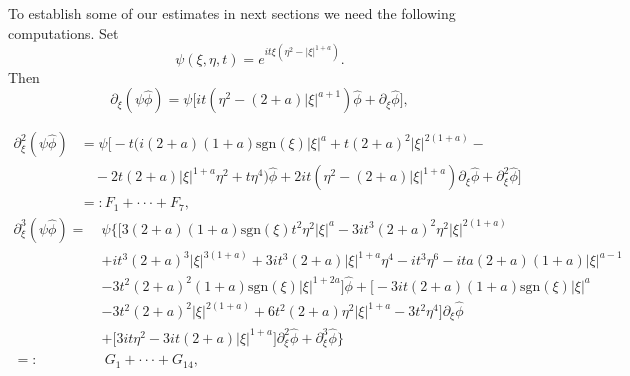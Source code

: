 \documentclass[reqno]{amsart}
\newcommand{\ha}{\hat{\phi}}
\newcommand{\p}{\partial}
\newcommand{\sgn}{\text{sgn}}
\numberwithin{equation}{section}
\begin{document}
To establish some of our estimates in next sections we need the following computations.
Set
\begin{equation}\label{psidef}
 \psi(\xi,\eta,t)=e^{it\xi(\eta^2-|\xi|^{1+a})}.
\end{equation}
Then
\begin{equation}\label{F1}
\partial_{\xi}(\psi\ha)=\psi\big[it(\eta^2 - (2+a)|\xi|^{a+1})\hat{\phi}+\p_\xi \ha \big],
\end{equation}

\begin{equation}
\begin{split}\label{F2}
\p_\xi^{2}(\psi\ha)&= \psi \big[-t(i(2+a)(1+a)\sgn(\xi)|\xi|^a + t(2+a)^2|\xi|^{2(1+a)}-\\
          &\quad - 2t(2+a)|\xi|^{1+a}\eta^2 +t\eta^4)\ha + 2it(\eta^2-(2+a)|\xi|^{1+a})\p_\xi \ha + \p_\xi ^{2}\ha \big]\\
           &=: F_1+\cdot\cdot\cdot + F_7,
\end{split}
\end{equation}
\begin{equation}
\begin{split}\label{F3}
\p_\xi^{3}(\psi\ha)= \ &\psi \Bigg \{\Big[3(2+a)(1+a)\sgn(\xi)t^2\eta^2 |\xi|^a- 3it^3(2+a)^2 \eta^2|\xi|^{2(1+a)}\\
          &+it^3(2+a)^3 |\xi|^{3(1+a)}+ 3it^3(2+a)|\xi|^{1+a}\eta^4-it^3\eta^6-i t a(2+a)(1+a)|\xi|^{a-1}\\
                     & -3t^2(2+a)^2 (1+a)\sgn(\xi)|\xi|^{1+2a}\Big] \ha +\Big[-3it(2+a)(1+a)\sgn(\xi)|\xi|^a \\
           & -3t^2(2+a)^2 |\xi|^{2(1+a)}+6t^2(2+a)\eta^2|\xi|^{1+a}-3t^2\eta^4\Big ]\p_\xi \ha\\
           & +\Big[3it\eta^2 -3it (2+a)|\xi|^{1+a} \Big]\p_\xi^2 \ha+\p_\xi^3 \ha \Bigg\}\\
          =:& \ G_1 + \cdot\cdot\cdot + G_{14},
\end{split}
\end{equation}
\end{document}
